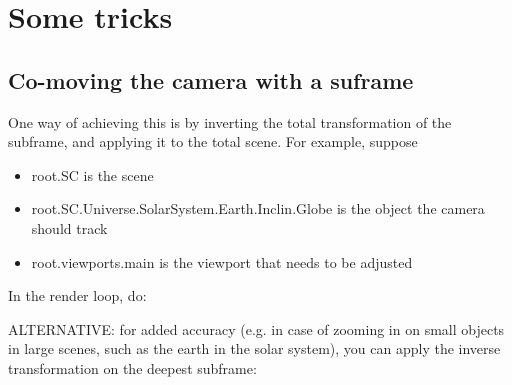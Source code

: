 \chapter{Some tricks}

\section{Co-moving the camera with a suframe}





One way of achieving this is by inverting the total transformation of the subframe, and applying it to the total scene.
For example, suppose
\begin{itemize}
\item root.SC is the scene
\item root.SC.Universe.SolarSystem.Earth.Inclin.Globe is the object the camera should track
\item root.viewports.main is the viewport that needs to be adjusted
\end{itemize}

In the render loop, do:\\


ALTERNATIVE:
for added accuracy (e.g. in case of zooming in on small objects in large scenes, such as the earth in the solar system),
you can apply the inverse transformation on the deepest subframe:

